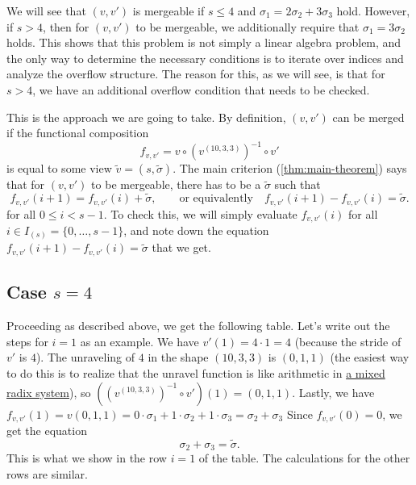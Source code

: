 \documentclass{article}
\theoremstyle{definition} %
\begin{document}
We will see that $(v, v')$ is mergeable if $s \leq 4$ and $\sigma_1 = 2 \sigma_2 + 3 \sigma_3$ hold.
However, if $s > 4$, then for $(v, v')$ to be mergeable, we additionally require that $\sigma_1 = 3 \sigma_2$ holds.
This shows that 
this problem is not simply a linear algebra problem,
and the only way to determine the necessary conditions is to iterate over indices and analyze the overflow structure.
The reason for this, as we will see, is that for $s > 4$, we have an additional overflow condition that needs to be checked.

This is the approach we are going to take.
By definition, $(v, v')$ can be merged if the functional composition
\[
    f_{v, v'} = v \circ (v^{(10, 3, 3)})^{-1} \circ v'
\]
is equal to some view $\tilde v = (s, \tilde \sigma)$.
The main criterion (\cref{thm:main-theorem}) says that for $(v, v')$ to be mergeable, there has to be a $\tilde \sigma$ such that
\begin{equation}
  \label{eq:main-criterion-for-example}
    f_{v, v'}(i + 1) = f_{v, v'}(i) + \tilde \sigma, \qquad \text{or equivalently} \quad
    f_{v, v'}(i + 1) - f_{v, v'}(i) = \tilde \sigma.
\end{equation}
for all $0 \leq i < s - 1$.
To check this, we will simply evaluate $f_{v, v'}(i)$ for all $i \in I_{(s)} = \{0, \ldots, s-1\}$,
and note down the equation $f_{v, v'}(i + 1) - f_{v, v'}(i) = \tilde \sigma$ that we get.

\subsection{Case $s = 4$}

Proceeding as described above, we get the following table.
Let's write out the steps for $i = 1$ as an example.
We have $v'(1) = 4 \cdot 1 = 4$ (because the stride of $v'$ is $4$).
The unraveling of $4$ in the shape $(10, 3, 3)$ is $(0, 1, 1)$ (the easiest way to do this is to realize
that the unravel function is like arithmetic in \href{https://en.wikipedia.org/wiki/Mixed_radix}{a mixed radix system}),
so $((v^{(10, 3, 3)})^{-1} \circ v')(1) = (0, 1, 1)$.
Lastly, we have $f_{v, v'}(1) = v(0, 1, 1) = 0 \cdot \sigma_1 + 1 \cdot \sigma_2 + 1 \cdot \sigma_3 = \sigma_2 + \sigma_3$
Since $f_{v, v'}(0) = 0$, we get the equation
\[
  \sigma_2 + \sigma_3 = \tilde \sigma.
\]
This is what we show in the row $i = 1$ of the table.
The calculations for the other rows are similar.
\end{document}
